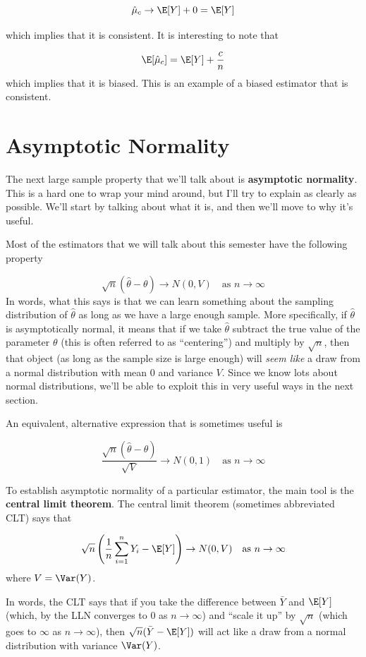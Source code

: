 \documentclass[
  letterpaper,
  DIV=11,
  numbers=noendperiod]{scrreprt}
\begin{document}
\[
  \hat{\mu}_c \rightarrow \E[Y] + 0 = \E[Y]
\]

which implies that it is consistent. It is interesting to note that

\[
  \E[\hat{\mu}_c] = \E[Y] + \frac{c}{n}
\] which implies that it is biased. This is an example of a biased
estimator that is consistent.

\section{Asymptotic Normality}\label{asymptotic-normality}

The next large sample property that we'll talk about is
\textbf{asymptotic normality}. This is a hard one to wrap your mind
around, but I'll try to explain as clearly as possible. We'll start by
talking about what it is, and then we'll move to why it's useful.

Most of the estimators that we will talk about this semester have the
following property

\[
  \sqrt{n}\left( \hat{\theta} - \theta \right) \rightarrow N(0,V) \quad \textrm{as } n \rightarrow \infty
\] In words, what this says is that we can learn something about the
sampling distribution of \(\hat{\theta}\) as long as we have a large
enough sample. More specifically, if \(\hat{\theta}\) is asymptotically
normal, it means that if we take \(\hat{\theta}\) subtract the true
value of the parameter \(\theta\) (this is often referred to as
``centering'') and multiply by \(\sqrt{n}\), then that object (as long
as the sample size is large enough) will \emph{seem like} a draw from a
normal distribution with mean 0 and variance \(V\). Since we know lots
about normal distributions, we'll be able to exploit this in very useful
ways in the next section.

An equivalent, alternative expression that is sometimes useful is

\[
  \frac{\sqrt{n}\left( \hat{\theta} - \theta\right)}{\sqrt{V}} \rightarrow N(0,1) \quad \textrm{as } n \rightarrow \infty
\]

To establish asymptotic normality of a particular estimator, the main
tool is the \textbf{central limit theorem}. The central limit theorem
(sometimes abbreviated CLT) says that

\[
  \sqrt{n}\left( \frac{1}{n} \sum_{i=1}^n Y_i - \E[Y]\right) \rightarrow N(0,V) \quad \textrm{as } n \rightarrow \infty
\] where \(V = \Var(Y)\).

In words, the CLT says that if you take the difference between
\(\bar{Y}\) and \(\E[Y]\) (which, by the LLN converges to 0 as
\(n \rightarrow \infty\)) and ``scale it up'' by \(\sqrt{n}\) (which
goes to \(\infty\) as \(n \rightarrow \infty\)), then
\(\sqrt{n}(\bar{Y} - \E[Y])\) will act like a draw from a normal
distribution with variance \(\Var(Y)\).
\end{document}
